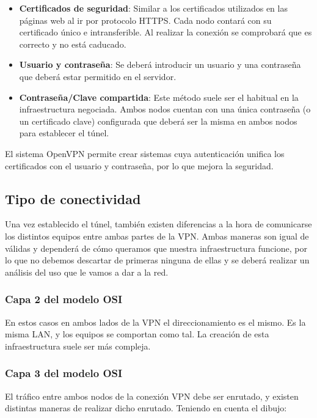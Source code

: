 \begin{itemize}
    \item \textbf{Certificados de seguridad}: Similar a los certificados utilizados en las páginas web al ir por protocolo HTTPS. Cada nodo contará con su certificado único e intransferible. Al realizar la conexión se comprobará que es correcto y no está caducado.

    \item \textbf{Usuario y contraseña}: Se deberá introducir un usuario y una contraseña que deberá estar permitido en el servidor.

    \item \textbf{Contraseña/Clave compartida}: Este método suele ser el habitual en la infraestructura negociada. Ambos nodos cuentan con una única contraseña (o un certificado clave) configurada que deberá ser la misma en ambos nodos para establecer el túnel.
\end{itemize}


El sistema OpenVPN permite crear sistemas cuya autenticación unifica los certificados con el usuario y contraseña, por lo que mejora la seguridad.


\subsection{Tipo de conectividad}
Una vez establecido el túnel, también existen diferencias a la hora de comunicarse los distintos equipos entre ambas partes de la VPN. Ambas maneras son igual de válidas y dependerá de cómo queramos que nuestra infraestructura funcione, por lo que no debemos descartar de primeras ninguna de ellas y se deberá realizar un análisis del uso que le vamos a dar a la red.


\subsubsection{Capa 2 del modelo OSI}
En estos casos en ambos lados de la VPN el direccionamiento es el mismo. Es la misma LAN, y los equipos se comportan como tal. La creación de esta infraestructura suele ser más compleja.

\subsubsection{Capa 3 del modelo OSI}
El tráfico entre ambos nodos de la conexión VPN debe ser enrutado, y existen distintas maneras de realizar dicho enrutado. Teniendo en cuenta el dibujo:

